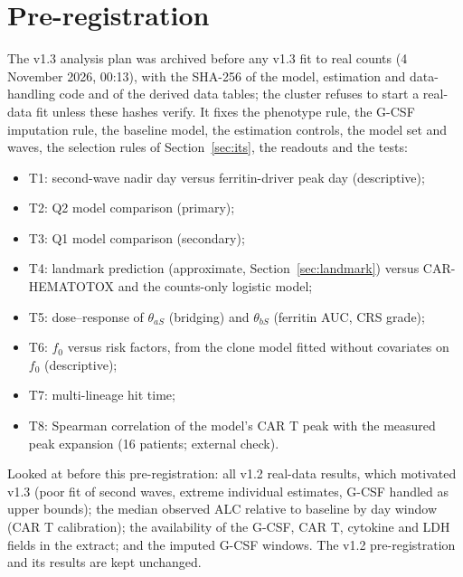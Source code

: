 \documentclass[11pt]{article}
\begin{document}
\section{Pre-registration}\label{sec:prereg}
The v1.3 analysis plan was archived before any v1.3 fit to real counts (4 November 2026, 00:13), with the SHA-256 of the model, estimation and data-handling code and of the derived data tables; the cluster refuses to start a real-data fit unless these hashes verify. It fixes the phenotype rule, the G-CSF imputation rule, the baseline model, the estimation controls, the model set and waves, the selection rules of Section~\ref{sec:its}, the readouts and the tests:
\begin{itemize}
\item T1: second-wave nadir day versus ferritin-driver peak day (descriptive);
\item T2: Q2 model comparison (primary);
\item T3: Q1 model comparison (secondary);
\item T4: landmark prediction (approximate, Section~\ref{sec:landmark}) versus CAR-HEMATOTOX and the counts-only logistic model;
\item T5: dose--response of $\theta_{aS}$ (bridging) and $\theta_{bS}$ (ferritin AUC, CRS grade);
\item T6: $f_0$ versus risk factors, from the clone model fitted without covariates on $f_0$ (descriptive);
\item T7: multi-lineage hit time;
\item T8: Spearman correlation of the model's CAR T peak with the measured peak expansion (16 patients; external check).
\end{itemize}
Looked at before this pre-registration: all v1.2 real-data results, which motivated v1.3 (poor fit of second waves, extreme individual estimates, G-CSF handled as upper bounds); the median observed ALC relative to baseline by day window (CAR T calibration); the availability of the G-CSF, CAR T, cytokine and LDH fields in the extract; and the imputed G-CSF windows. The v1.2 pre-registration and its results are kept unchanged.
\end{document}
